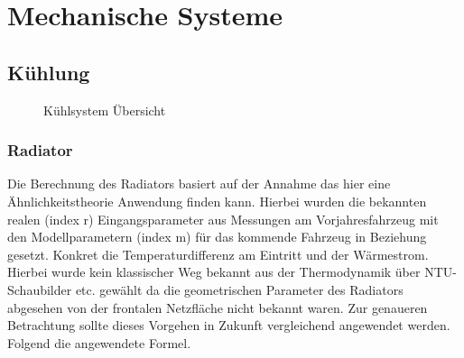 
\chapter{Mechanische Systeme}

%
%
%


\section{Kühlung}

\begin{figure}[H]
	\centering
	
	\caption{Kühlsystem Übersicht}
	\label{abb:Coolingssystem}
\end{figure}

\FloatBarrier
\subsection{Radiator}
Die Berechnung des Radiators basiert auf der Annahme das hier eine Ähnlichkeitstheorie Anwendung finden kann. Hierbei wurden die bekannten realen (index r) Eingangsparameter aus Messungen am Vorjahresfahrzeug mit den Modellparametern (index m) für das kommende Fahrzeug in Beziehung gesetzt. Konkret die Temperaturdifferenz am Eintritt und der Wärmestrom. Hierbei wurde kein klassischer Weg bekannt aus der Thermodynamik über NTU-Schaubilder etc. gewählt da die geometrischen Parameter des Radiators abgesehen von der frontalen Netzfläche nicht bekannt waren. Zur genaueren Betrachtung sollte dieses Vorgehen in Zukunft vergleichend angewendet werden. Folgend die angewendete Formel.

